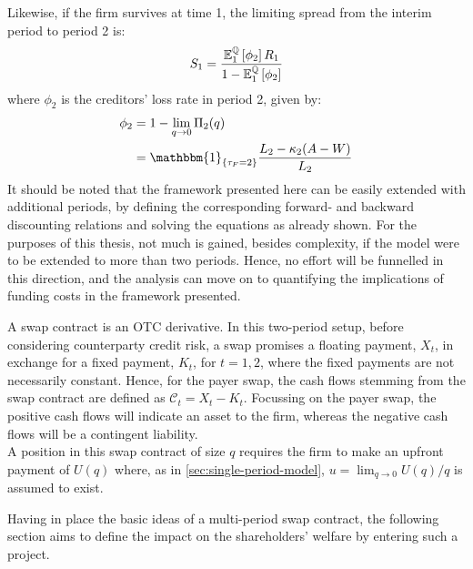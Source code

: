 \documentclass[main.tex]{subfiles}
\begin{document}
        Likewise, if the firm survives at time 1, 
        the limiting spread from the interim period to period 2 is:
        \begin{equation}
            S_1 =
            \frac{
                \mathbb{E}_{1}^{\mathbb{Q}}\left[\phi_2\right]R_1
            }{
                1 - \mathbb{E}_{1}^{\mathbb{Q}}\left[\phi_2\right] 
            }
        \end{equation}
        where $\phi_{2}$ is the creditors' loss rate in period 2, given by:
        \begin{align}
            \phi_2 
            &=
            1 - \lim_{q\rightarrow0} \Pi_{2}(q) 
            \nonumber \\
            &=
            \mathbbm{1}_{\{\tau_{F}=2\}}
            \frac{
                L_{2}-\kappa_{2}(A-W)
            }{
                L_{2}
            }
        \end{align}
        It should be noted that the framework presented here can be easily extended 
        with additional periods, 
        by defining the corresponding forward- and backward discounting relations
        and solving the equations as already shown.
        For the purposes of this thesis, not much is gained, besides complexity, 
        if the model were to be extended to more than two periods.
        Hence, no effort will be funnelled in this direction,
        and the analysis can move on to quantifying the implications of funding costs
        in the framework presented.

        A swap contract is an OTC derivative.
        In this two-period setup, before considering counterparty credit risk, a swap promises a floating payment, $X_t$, in exchange for a fixed payment, $K_t$, for $t = 1,2$, where the fixed payments are not necessarily constant.
        Hence, for the payer swap, the cash flows stemming from the swap contract are defined as $\mathcal{C}_t = X_t - K_t$.
        Focussing on the payer swap, the positive cash flows will indicate an asset to the firm, whereas the negative cash flows will be a contingent liability.
        \\
        A position in this swap contract of size $q$ requires the firm to make an upfront payment of $U(q)$ where, as in \cref{sec:single-period-model}, $u = \lim_{q \rightarrow 0} U(q)/q$ is assumed to exist.

        Having in place the basic ideas of a multi-period swap contract,
        the following section aims to define the impact on the shareholders' welfare by entering such a project.
\end{document}
